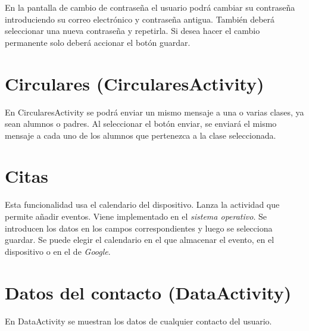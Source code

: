 		En la pantalla de cambio de contraseña el usuario podrá cambiar su contraseña introduciendo su correo electrónico y contraseña antigua. También deberá seleccionar una nueva contraseña y repetirla. Si desea hacer el cambio permanente solo deberá accionar el botón guardar.
	
	\section{Circulares ({\ttfamily CircularesActivity})} \label{sec:circulares}
	
		En {\ttfamily CircularesActivity} se podrá enviar un mismo mensaje a una o varias clases, ya sean alumnos o padres. Al seleccionar el botón enviar, se enviará el mismo mensaje a cada uno de los alumnos que pertenezca a la clase seleccionada.
	
	\section{Citas} \label{sec:dates}
		Esta funcionalidad usa el calendario del dispositivo. Lanza la actividad que permite añadir eventos. Viene implementado en el {\it sistema operativo}.
		Se introducen los datos en los campos correspondientes y luego se selecciona guardar. Se puede elegir el calendario en el que almacenar el evento, en el dispositivo o en el de {\it Google}.
	
	\section{Datos del contacto ({\ttfamily DataActivity})} \label{sec:data}
	
		En {\ttfamily DataActivity} se muestran los datos de cualquier contacto del usuario.